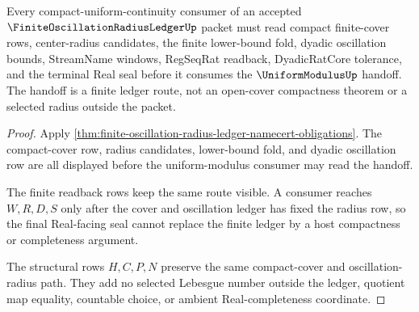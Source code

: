 \begin{theorem}
\label{thm:finite-oscillation-radius-ledger-uniform-handoff}
Every compact-uniform-continuity consumer of an accepted $\FiniteOscillationRadiusLedgerUp$ packet must read compact finite-cover rows, center-radius candidates, the finite lower-bound fold, dyadic oscillation bounds, StreamName windows, RegSeqRat readback, DyadicRatCore tolerance, and the terminal Real seal before it consumes the $\UniformModulusUp$ handoff. The handoff is a finite ledger route, not an open-cover compactness theorem or a selected radius outside the packet.
\end{theorem}
\begin{proof}
Apply \autoref{thm:finite-oscillation-radius-ledger-namecert-obligations}. The compact-cover row, radius candidates, lower-bound fold, and dyadic oscillation row are all displayed before the uniform-modulus consumer may read the handoff.

The finite readback rows keep the same route visible. A consumer reaches $W,R,D,S$ only after the cover and oscillation ledger has fixed the radius row, so the final Real-facing seal cannot replace the finite ledger by a host compactness or completeness argument.

The structural rows $H,C,P,N$ preserve the same compact-cover and oscillation-radius path. They add no selected Lebesgue number outside the ledger, quotient map equality, countable choice, or ambient Real-completeness coordinate.
\end{proof}

